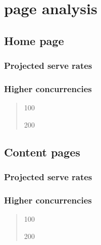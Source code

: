 \documentclass[letterpaper,10pt,english]{sphinxmanual}
\begin{document}
\section{page analysis}
\label{index:id7}

\subsection{Home page}
\label{index:id8}

\subsubsection{Projected serve rates}
\label{index:id9}

\subsubsection{Higher concurrencies}
\label{index:id10}\begin{quote}

100

200
\end{quote}


\subsection{Content pages}
\label{index:id11}

\subsubsection{Projected serve rates}
\label{index:id12}

\subsubsection{Higher concurrencies}
\label{index:id13}\begin{quote}

100

200
\end{quote}
\end{document}

